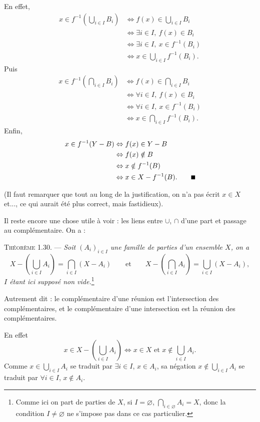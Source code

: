 En effet,
\begin{align*}
x\in f^{-1}\left(\bigcup_{i\in I}B_i\right)
&\Leftrightarrow f(x)\in\bigcup_{i\in I}B_i\\
&\Leftrightarrow\exists i\in I,\ f(x)\in B_i\\
&\Leftrightarrow\exists i\in I,\ x\in f^{-1}(B_i)\\
&\Leftrightarrow x\in\bigcup_{i\in I}f^{-1}(B_i).
\end{align*}
Puis
\begin{align*}
x\in f^{-1}\left(\bigcap_{i\in I}B_i\right)
&\Leftrightarrow f(x)\in\bigcap_{i\in I}B_i\\
&\Leftrightarrow\forall i\in I,\ f(x)\in B_i\\
&\Leftrightarrow\forall i\in I,\ x\in f^{-1}(B_i)\\
&\Leftrightarrow x\in\bigcap_{i\in I}f^{-1}(B_i).
\end{align*}
Enfin,
\begin{align*}
x\in f^{-1}(Y-B)
&\Leftrightarrow f(x)\in Y-B\\
&\Leftrightarrow f(x)\notin B\\
&\Leftrightarrow x\notin f^{-1}(B)\\
&\Leftrightarrow x\in X-f^{-1}(B).\qquad\rule{0.55em}{0.55em}
\end{align*}

(Il faut remarquer que tout au long de la justification, on n'a pas écrit $x\in X$ et..., ce qui aurait été plus correct, mais fastidieux).

Il reste encore une chose utile à voir : les liens entre $\cup$, $\cap$ d'une part et passage au complémentaire. On a :

\medskip\noindent\textsc{Théorème 1.30.} --- \emph{Soit $(A_i)_{i\in I}$ une famille de parties d'un ensemble $X$, on a}
\[
X-\left(\bigcup_{i\in I}A_i\right)=\bigcap_{i\in I}(X-A_i)
\qquad\text{et}\qquad
X-\left(\bigcap_{i\in I}A_i\right)=\bigcup_{i\in I}(X-A_i),
\]
\emph{$I$ étant ici supposé non vide.}\footnote{Comme ici on part de parties de $X$, si $I=\varnothing$, $\bigcap_{i\in\varnothing}A_i=X$, donc la condition $I\ne\varnothing$ ne s'impose pas dans ce cas particulier.}

Autrement dit : le complémentaire d'une réunion est l'intersection des complémentaires, et le complémentaire d'une intersection est la réunion des complémentaires.

En effet
\[
x\in X-\left(\bigcup_{i\in I}A_i\right)\Leftrightarrow x\in X\text{ et }x\notin\bigcup_{i\in I}A_i.
\]
Comme $x\in\bigcup_{i\in I}A_i$ se traduit par $\exists i\in I$, $x\in A_i$, sa négation $x\notin\bigcup_{i\in I}A_i$ se traduit par $\forall i\in I$, $x\notin A_i$.

